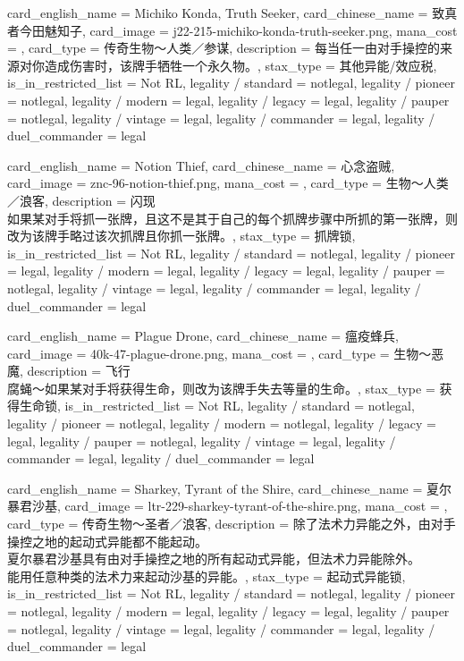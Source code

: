 \documentclass[lang = cn, color = black, 10pt]{AllThatStax}
\begin{document}
\card
{
	card_english_name = {Michiko Konda, Truth Seeker},
	card_chinese_name = {致真者今田魅知子},
	card_image = j22-215-michiko-konda-truth-seeker.png,
	mana_cost = ,
	card_type = 传奇生物～人类／参谋,
	description = {每当任一由对手操控的来源对你造成伤害时，该牌手牺牲一个永久物。},
	stax_type = 其他异能/效应税,
	is_in_restricted_list = Not RL,
	legality / standard = notlegal,
	legality / pioneer = notlegal,
	legality / modern = legal,
	legality / legacy = legal,
	legality / pauper = notlegal,
	legality / vintage = legal,
	legality / commander = legal,
	legality / duel_commander = legal
}

\card
{
	card_english_name = {Notion Thief},
	card_chinese_name = {心念盗贼},
	card_image = znc-96-notion-thief.png,
	mana_cost = ,
	card_type = 生物～人类／浪客,
	description = {闪现\\
如果某对手将抓一张牌，且这不是其于自己的每个抓牌步骤中所抓的第一张牌，则改为该牌手略过该次抓牌且你抓一张牌。},
	stax_type = 抓牌锁,
	is_in_restricted_list = Not RL,
	legality / standard = notlegal,
	legality / pioneer = legal,
	legality / modern = legal,
	legality / legacy = legal,
	legality / pauper = notlegal,
	legality / vintage = legal,
	legality / commander = legal,
	legality / duel_commander = legal
}

\card
{
	card_english_name = {Plague Drone},
	card_chinese_name = {瘟疫蜂兵},
	card_image = 40k-47-plague-drone.png,
	mana_cost = ,
	card_type = 生物～恶魔,
	description = {飞行\\
腐蝇～如果某对手将获得生命，则改为该牌手失去等量的生命。},
	stax_type = 获得生命锁,
	is_in_restricted_list = Not RL,
	legality / standard = notlegal,
	legality / pioneer = notlegal,
	legality / modern = notlegal,
	legality / legacy = legal,
	legality / pauper = notlegal,
	legality / vintage = legal,
	legality / commander = legal,
	legality / duel_commander = legal
}

\card
{
	card_english_name = {Sharkey, Tyrant of the Shire},
	card_chinese_name = {夏尔暴君沙基},
	card_image = ltr-229-sharkey-tyrant-of-the-shire.png,
	mana_cost = ,
	card_type = 传奇生物～圣者／浪客,
	description = {除了法术力异能之外，由对手操控之地的起动式异能都不能起动。\\
夏尔暴君沙基具有由对手操控之地的所有起动式异能，但法术力异能除外。\\
能用任意种类的法术力来起动沙基的异能。},
	stax_type = 起动式异能锁,
	is_in_restricted_list = Not RL,
	legality / standard = notlegal,
	legality / pioneer = notlegal,
	legality / modern = legal,
	legality / legacy = legal,
	legality / pauper = notlegal,
	legality / vintage = legal,
	legality / commander = legal,
	legality / duel_commander = legal
}
\end{document}
